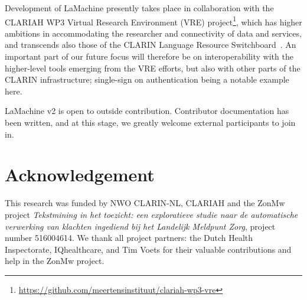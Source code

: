 \documentclass[a4paper,11pt]{article}
\begin{document}
Development of LaMachine presently takes place in collaboration with the CLARIAH WP3 Virtual Research Environment (VRE)
project\footnote{\url{https://github.com/meertensinstituut/clariah-wp3-vre}}, which has higher ambitions in
accommodating the researcher and connectivity of data and services, and transcends also those of the CLARIN Language
Resource Switchboard~\cite{switchboard}. An important part of our future focus will therefore be on interoperability
with the higher-level tools emerging from the VRE efforts, but also with other parts of the CLARIN infrastructure;
single-sign on authentication being a notable example here.

LaMachine v2 is open to  outside contribution. Contributor documentation has been written, and at this stage, we greatly
welcome external participants to join in.

\section*{Acknowledgement}

This research was funded by NWO CLARIN-NL, CLARIAH and the ZonMw project {\it Tekstmining in het toezicht: een exploratieve studie naar de automatische verwerking van klachten ingediend bij het Landelijk Meldpunt Zorg}, project number 516004614. We thank all project partners: the Dutch Health Inspectorate, IQhealthcare, and Tim Voets for their valuable contributions and help in the ZonMw project.



\end{document}
